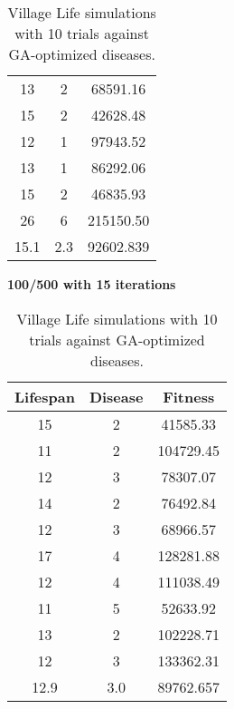 \documentclass[conference,compsoc]{IEEEtran}
\begin{document}
\begin{table}[!t]
\begin{center}
\begin{minipage}{0.25\textwidth}
\begin{tabular}{|c|c|c|}
	13 & 2 &  68591.16\\
	15 & 2 &  42628.48\\
	12 & 1 &  97943.52\\
	13 & 1 &  86292.06\\
	15 & 2 &  46835.93\\
	26 & 6 & 215150.50\\ %
	\hline
	15.1 & 2.3 & 92602.839\\
	\hline
	\end{tabular}
\end{minipage}%
\begin{minipage}{0.25\textwidth}
\centering
\textbf{100/500 with 15 iterations}\\
	\begin{tabular}{|c|c|c|}
	\hline
	Lifespan & Disease & Fitness\\
	\hline
	15 & 2 &  41585.33\\
	11 & 2 & 104729.45\\
	12 & 3 &  78307.07\\
	14 & 2 &  76492.84\\
	12 & 3 &  68966.57\\
	17 & 4 & 128281.88\\
	12 & 4 & 111038.49\\
	11 & 5 &  52633.92\\
	13 & 2 & 102228.71\\
	12 & 3 & 133362.31\\
	\hline
	12.9 & 3.0 & 89762.657\\
	\hline
	\end{tabular}
\end{minipage}%
\end{center}
\caption{Village Life simulations with 10 trials against GA-optimized diseases.}
\label{fig:DefaultExperiment}
\end{table}
\end{document}
